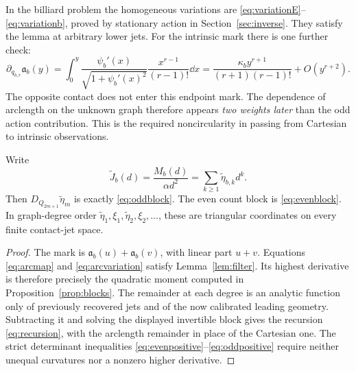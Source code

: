 In the billiard problem the homogeneous variations are
\eqref{eq:variationE}--\eqref{eq:variationb}, proved by stationary
action in Section~\ref{sec:inverse}. They satisfy the lemma at arbitrary
lower jets. For the intrinsic mark there is one further check:
\begin{equation}\label{eq:arcvariation}
 \partial_{q_{b,r}}\mathfrak a_b(y)
 =\int_0^y\frac{\psi_b'(x)}{\sqrt{1+\psi_b'(x)^2}}
                    \frac{x^{r-1}}{(r-1)!}\dd x
 =\frac{\kappa_b y^{r+1}}{(r+1)(r-1)!}+O(y^{r+2}).
\end{equation}
The opposite contact does not enter this endpoint mark. The dependence
of arclength on the unknown graph therefore appears \emph{two weights
later} than the odd action contribution. This is the required
noncircularity in passing from Cartesian to intrinsic observations.

\begin{proposition}\label{prop:arcinverse}
Write
\begin{equation}\label{eq:arcseries}
 \widetilde J_b(d)=\frac{M_b(d)}{\alpha d^2}
               =\sum_{k\ge1}\widetilde\eta_{b,k}d^k.
\end{equation}
Then $D_{Q_{2m+1}}\widetilde\eta_m$ is exactly
\eqref{eq:oddblock}. The even count block is \eqref{eq:evenblock}.
In graph-degree order
$\widetilde\eta_1,\xi_1,\widetilde\eta_2,\xi_2,\ldots$,
these are triangular coordinates on every finite contact-jet space.
\end{proposition}
\begin{proof}
The mark is $\mathfrak a_b(u)+\mathfrak a_b(v)$, with linear part
$u+v$. Equations \eqref{eq:arcmap} and \eqref{eq:arcvariation} satisfy
Lemma~\ref{lem:filter}. Its highest derivative is therefore precisely
the quadratic moment computed in Proposition~\ref{prop:blocks}.
The remainder at each degree is an analytic function only of previously
recovered jets and of the now calibrated leading geometry. Subtracting
it and solving the displayed invertible block gives the recursion
\eqref{eq:recursion}, with the arclength remainder in place of the
Cartesian one. The strict determinant inequalities
\eqref{eq:evenpositive}--\eqref{eq:oddpositive} require neither unequal
curvatures nor a nonzero higher derivative.
\end{proof}


